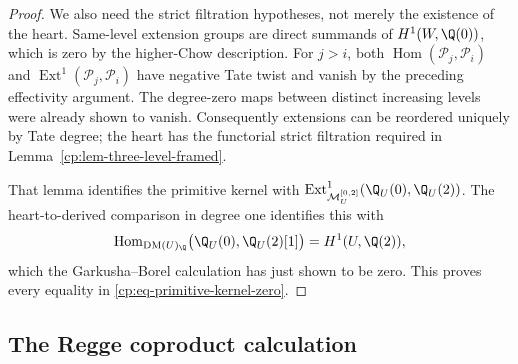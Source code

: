 \begin{proof}
We also need the strict filtration hypotheses, not merely the existence of
the heart.  Same-level extension groups are direct summands of
\(H^1(W,\Q(0))\), which is zero by the higher-Chow description.
For \(j>i\), both
\(\operatorname{Hom}(\mathcal P_j,\mathcal P_i)\) and
\(\operatorname{Ext}^1(\mathcal P_j,\mathcal P_i)\) have negative Tate
twist and vanish by the preceding effectivity argument.  The degree-zero
maps between distinct increasing levels were already shown to vanish.
Consequently extensions can be reordered uniquely by Tate degree; the
heart has the functorial strict filtration required in
Lemma~\ref{cp:lem-three-level-framed}.

That lemma identifies the primitive kernel with
\(\Ext^1_{\mathcal M_U^{[0,2]}}(\Q_U(0),\Q_U(2))\).
The heart-to-derived comparison in degree one identifies this with
\[
 \operatorname{Hom}_{\DM(U)_\Q}
 \bigl(\Q_U(0),\Q_U(2)[1]\bigr)=H^1(U,\Q(2)),
\]
which the Garkusha--Borel calculation has just shown to be zero.  This
proves every equality in \eqref{cp:eq-primitive-kernel-zero}.
\end{proof}

\subsection{The Regge coproduct calculation}

